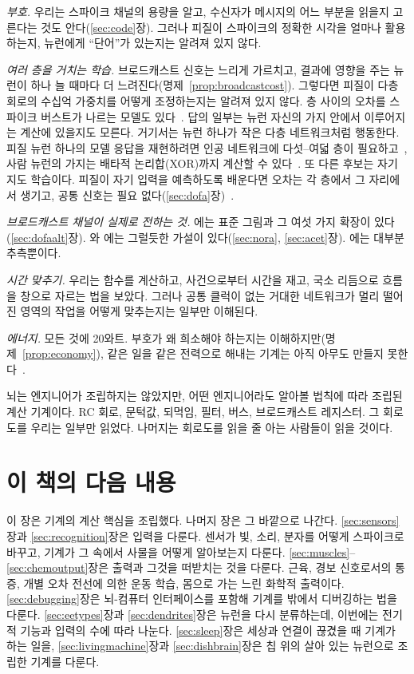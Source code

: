 \emph{부호.} 우리는 스파이크 채널의 용량을 알고, 수신자가 메시지의 어느 부분을 읽을지 고른다는 것도 안다(\ref{sec:code}장). 그러나 피질이 스파이크의 정확한 시각을 얼마나 활용하는지, 뉴런에게 “단어”가 있는지는 알려져 있지 않다.

\emph{여러 층을 거치는 학습.} 브로드캐스트 신호는 느리게 가르치고, 결과에 영향을 주는 뉴런이 하나 늘 때마다 더 느려진다(명제~\ref{prop:broadcastcost}). 그렇다면 피질이 다층 회로의 수십억 가중치를 어떻게 조정하는지는 알려져 있지 않다. 층 사이의 오차를 스파이크 버스트가 나르는 모델도 있다~\cite{Payeur2021}. 답의 일부는 뉴런 자신의 가지 안에서 이루어지는 계산에 있을지도 모른다. 거기서는 뉴런 하나가 작은 다층 네트워크처럼 행동한다. 피질 뉴런 하나의 모델 응답을 재현하려면 인공 네트워크에 다섯--여덟 층이 필요하고~\cite{Beniaguev2021}, 사람 뉴런의 가지는 배타적 논리합(XOR)까지 계산할 수 있다~\cite{Gidon2020}. 또 다른 후보는 자기 지도 학습이다. 피질이 자기 입력을 예측하도록 배운다면 오차는 각 층에서 그 자리에서 생기고, 공통 신호는 필요 없다(\ref{sec:dofa}장)~\cite{Keller2018}.

\emph{브로드캐스트 채널이 실제로 전하는 것.} 에는 표준 그림과 그 여섯 가지 확장이 있다(\ref{sec:dofaalt}장). 와 에는 그럴듯한 가설이 있다(\ref{sec:nora}, \ref{sec:acet}장). 에는 대부분 추측뿐이다.

\emph{시간 맞추기.} 우리는 함수를 계산하고, 사건으로부터 시간을 재고, 국소 리듬으로 흐름을 창으로 자르는 법을 보았다. 그러나 공통 클럭이 없는 거대한 네트워크가 멀리 떨어진 영역의 작업을 어떻게 맞추는지는 일부만 이해된다.

\emph{에너지.} 모든 것에 20와트. 부호가 왜 희소해야 하는지는 이해하지만(명제~\ref{prop:economy}), 같은 일을 같은 전력으로 해내는 기계는 아직 아무도 만들지 못한다~\cite{MehonicKenyon2022}.

뇌는 엔지니어가 조립하지는 않았지만, 어떤 엔지니어라도 알아볼 법칙에 따라 조립된 계산 기계이다. RC 회로, 문턱값, 되먹임, 필터, 버스, 브로드캐스트 레지스터. 그 회로도를 우리는 일부만 읽었다. 나머지는 회로도를 읽을 줄 아는 사람들이 읽을 것이다.

\section{이 책의 다음 내용}

이 장은 기계의 계산 핵심을 조립했다. 나머지 장은 그 바깥으로 나간다. \ref{sec:sensors}장과 \ref{sec:recognition}장은 입력을 다룬다. 센서가 빛, 소리, 분자를 어떻게 스파이크로 바꾸고, 기계가 그 속에서 사물을 어떻게 알아보는지 다룬다. \ref{sec:muscles}--\ref{sec:chemoutput}장은 출력과 그것을 떠받치는 것을 다룬다. 근육, 경보 신호로서의 통증, 개별 오차 전선에 의한 운동 학습, 몸으로 가는 느린 화학적 출력이다. \ref{sec:debugging}장은 뇌-컴퓨터 인터페이스를 포함해 기계를 밖에서 디버깅하는 법을 다룬다. \ref{sec:eetypes}장과 \ref{sec:dendrites}장은 뉴런을 다시 분류하는데, 이번에는 전기적 기능과 입력의 수에 따라 나눈다. \ref{sec:sleep}장은 세상과 연결이 끊겼을 때 기계가 하는 일을, \ref{sec:livingmachine}장과 \ref{sec:dishbrain}장은 칩 위의 살아 있는 뉴런으로 조립한 기계를 다룬다.

